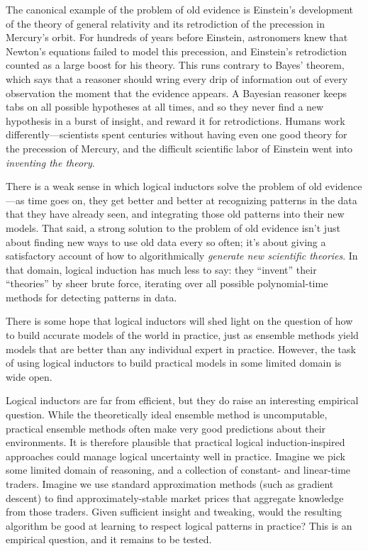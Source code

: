 \documentclass[authordate,onecolumn,noenvironments]{miri-tech-article}
\numberwithin{equation}{subsection}
\begin{document}
\desoldev*

\noindent The canonical example of the problem of old evidence is Einstein's development of the theory of general relativity and its retrodiction of the precession in Mercury's orbit. For hundreds of years before Einstein, astronomers knew that Newton's equations failed to model this precession, and Einstein's retrodiction counted as a large boost for his theory. This runs contrary to Bayes' theorem, which says that a reasoner should wring every drip of information out of every observation the moment that the evidence appears. A Bayesian reasoner keeps tabs on all possible hypotheses at all times, and so they never find a new hypothesis in a burst of insight, and reward it for retrodictions. Humans work differently---scientists spent centuries without having even one good theory for the precession of Mercury, and the difficult scientific labor of Einstein went into \emph{inventing the theory}.

There is a weak sense in which logical inductors solve the problem of old evidence---as time goes on, they get better and better at recognizing patterns in the data that they have already seen, and integrating those old patterns into their new models. That said, a strong solution to the problem of old evidence isn't just about finding new ways to use old data every so often; it's about giving a satisfactory account of how to algorithmically \emph{generate new scientific theories}. In that domain, logical induction has much less to say: they ``invent'' their ``theories'' by sheer brute force, iterating over all possible polynomial-time methods for detecting patterns in data.

There is some hope that logical inductors will shed light on the question of how to build accurate models of the world in practice, just as ensemble methods yield models that are better than any individual expert in practice. However, the task of using logical inductors to build practical models in some limited domain is wide open.

\desefficient*

\noindent Logical inductors are far from efficient, but they do raise an interesting empirical question.
While the theoretically ideal ensemble method  is uncomputable, practical ensemble methods often make very good predictions about their environments. It is therefore plausible that practical logical induction-inspired approaches could manage logical uncertainty well in practice. Imagine we pick some limited domain of reasoning, and a collection of constant- and linear-time traders. Imagine we use standard approximation methods (such as gradient descent) to find approximately-stable market prices that aggregate knowledge from those traders. Given sufficient insight and tweaking, would the resulting algorithm be good at learning to respect logical patterns in practice?  This is an empirical question, and it remains to be tested.
\end{document}
